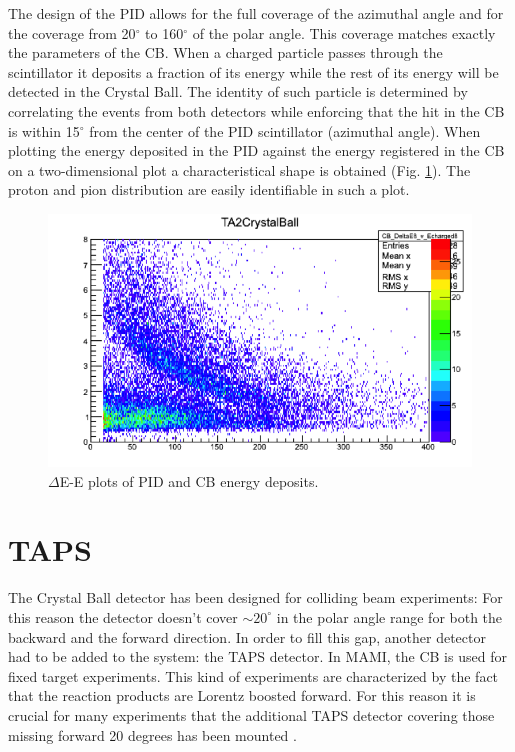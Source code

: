 \indent The design of the PID allows for the full coverage of the azimuthal angle and for the coverage from 20$^{\circ}$ to 160$^{\circ}$ of the polar angle. This coverage matches exactly the parameters of the CB. When  a  charged  particle  passes  through  the  scintillator  it  deposits  a fraction of its energy while the rest of its energy will be detected in the Crystal Ball. The identity  of  such  particle  is  determined  by  correlating  the  events  from  both detectors while enforcing that the hit in the CB is within 15$^{\circ}$ from the center of the PID scintillator (azimuthal angle). When plotting the energy deposited in the PID against the energy registered in the CB on a two-dimensional plot a characteristical shape is obtained (Fig. \ref{banana}). The proton and pion distribution are easily identifiable in such a plot.

\begin{figure}[H]
\begin{center}
\includegraphics[scale=0.8]{pictures/png/banana.png}
\caption{$\Delta$E-E plots of PID and CB energy deposits.}
\label{banana}
\end{center}
\end{figure}

\section{TAPS}

\indent The Crystal Ball detector has been designed for colliding beam experiments: For this reason the detector  doesn't  cover  $\sim 20^{\circ}$ in the polar  angle  range  for both the  backward  and  the forward direction. In order to fill this gap,  another detector had to be added to the system: the TAPS detector. In MAMI,  the  CB  is  used  for fixed  target  experiments. This kind of experiments are characterized by the fact that the reaction products are Lorentz boosted forward. For this reason it is crucial for many experiments that the additional TAPS detector  covering  those  missing  forward  20  degrees has  been  mounted \cite{novotny}.

